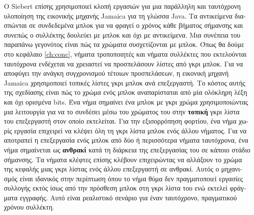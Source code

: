 \begin{greek}
Ο Siebert \cite{DBLP:conf/iwmm/Siebert10} επίσης χρησιμοποιεί
κλοπή εργασιών για μια παράλληλη και ταυτόχρονη υλοποίηση της
εικονικής μηχανής Jamaica για τη γλώσσα Java. Τα αντικείμενα
διασπώνται σε συνδεδεμένα μπλοκ για να φραγεί ο χρόνος κάθε
βήματος σήμανσης και συνεπώς ο συλλέκτης δουλεύει με μπλοκ και
όχι με αντικείμενα. Μια συνέπεια του παραπάνω γεγονότος είναι
πώς τα χρώματα συσχετίζονται με μπλοκ. Όπως θα δούμε στο κεφάλαιο
\ref{ch:conc}, νήματα τροποποιητές και νήματα συλλέκτες
που εκτελούνται ταυτόχρονα ενδέχεται να χρειαστεί να προσπελάσουν
λίστες από γκρι μπλοκ. Για να αποφύγει την ανάγκη συγχρονισμού
τέτοιων προσπελάσεων, η εικονική μηχανή Jamaica χρησιμοποιεί
τοπικές λίστες γκρι μπλοκ ανά επεξεργαστή. Το κόστος αυτής της
σχεδίασης είναι πώς το χρώμα ενός μπλοκ αναπαρίσταται από μία
ολόκληρη λέξη και όχι ορισμένα bits. Ένα νήμα σημαίνει ένα
μπλοκ με γκρι χρώμα χρησιμοποιώντας μια λειτουργία 
για να το συνδέσει μέσω του χρώματος του στην \textbf{τοπική}
γκρι λίστα του επεξεργαστή στον οποίο εκτελείται. Για την
εξισορρόπηση φορτίου, ένα νήμα χωρίς εργασία επιχειρεί να
κλέψει όλη τη γκρι λίστα μπλοκ ενός άλλου νήματος. Για να
αποτραπεί η επεξεργασία ενός μπλοκ από δύο ή περισσότερα νήματα
ταυτόχρονα, ένα νήμα σημαίνεται ως \textbf{ανθρακί} κατά τη
διάρκεια της επεξεργασίας του σε κάποιο στάδιο σήμανσης. Τα
νήματα κλέφτες επίσης κλέβουν επιχειρώντας να αλλάξουν το χρώμα
της κεφαλής μιας γκρι λίστας ενός άλλου επεξεργαστή σε ανθρακί.
Αυτός ο μηχανισμός είναι ιδανικός στην περίπτωση όπου το νήμα
θύμα δεν πραγματοποιεί εργασίες συλλογής εκτός ίσως από την
πρόσθεση μπλοκ στη γκρι λίστα του ενώ εκτελεί φράγματα εγγραφής.
Αυτό είναι ρεαλιστικό σενάριο για έναν ταυτόχρονο, πραγματικού
χρόνου συλλέκτη.


\end{greek}
